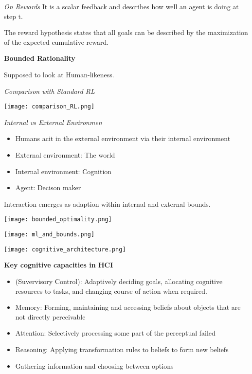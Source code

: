 \textit{On Rewards} \smallskip
It is a scalar feedback and describes how well an agent is doing at step t. 


The reward hypothesis states that all goals can be described by the maximization of the expected cumulative reward. 

\textbf{Bounded Rationality}

Supposed to look at Human-likeness.

\textit{Comparison with Standard RL} \smallskip

\begin{center}
	\texttt{[image: comparison\_RL.png]}
\end{center}

\textit{Internal vs External Environmen} \smallskip

\begin{itemize}[itemsep=-5pt, topsep=0pt, leftmargin=*]
	\item Humans acit in the external environment via their internal environment
	\item External environment: The world
	\item Internal environment: Cognition
	\item Agent: Decison maker
\end{itemize}

Interaction emerges as adaption within internal and external bounds. 


\begin{center}
	\texttt{[image: bounded\_optimality.png]}
\end{center}


\begin{center}
	\texttt{[image: ml\_and\_bounds.png]}
\end{center}




\begin{center}
	\texttt{[image: cognitive\_architecture.png]}
\end{center}


\textbf{Key cognitive capacities in HCI} \smallskip

\begin{itemize}[itemsep=-5pt, topsep=0pt, leftmargin=*]
	\item (Suvervisory Control): Adaptively deciding goals, allocating cognitive resources to tasks, and changing course of action when required. 
	\item Memory: Forming, maintaining and accessing beliefs about objects that are not directly perceivable
	\item Attention: Selectively processing some part of the perceptual failed
	\item Reasoning: Applying transformation rules to beliefs to form new beliefs
	\item Gathering information and choosing between options
\end{itemize}

